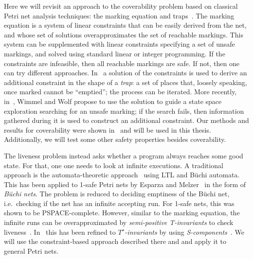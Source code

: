 Here we will revisit an approach to the coverability problem based
on classical Petri net analysis techniques: the marking equation and
traps~\cite{Murata89,Reisig13}.
The marking equation is a system of linear constraints that can be
easily derived from the net, and whose set of solutions
overapproximates the set of reachable markings. This system
can be supplemented with linear constraints specifying a set of unsafe
markings, and solved using standard linear or integer programming. If
the constraints are infeasible, then all reachable markings are safe. If
not, then one can try different approaches. In~\cite{EsparzaMelzer00}
a solution of the constraints is used to derive an additional constraint 
in the shape of a \emph{trap}: a set of places that, loosely speaking, once 
marked cannot be ``emptied''; the process can be iterated.
More recently,
in~\cite{WimmelWolf12}, Wimmel and Wolf propose to use the solution to guide a
state space exploration searching for an unsafe marking; if the search fails, 
then information gathered during it is used to construct an additional
constraint.
Our methods and results for coverability were shown
in~\cite{EsparzaLMMN14} and will be used in this thesis.
Additionally, we will test some other safety properties besides coverability.

The liveness problem instead asks whether a program always reaches some good state.
For that, one one needs to look at infinite executions.
A traditional approach is the automata-theoretic approach~\cite{VardiWolper86}
using LTL and Büchi automata.
This has been applied to 1-safe Petri nets by Esparza and Melzer~\cite{EsparzaMelzer97}
in the form of \emph{Büchi nets}.
The problem is reduced to deciding emptiness of the Büchi net, i.e.\ checking if the net
has an infinite accepting run. For 1-safe nets, this was shown to be PSPACE-complete.
However, similar to the marking equation, the infinite runs can be
overapproximated by \emph{semi-positive T-invariants} to check liveness~\cite{EsparzaBruns96}.
In~\cite{EsparzaMelzer97} this has been refined to \emph{$T^\star$-invariants} by using
\emph{S-components}~\cite{DeselEsparza95}.
We will use the constraint-based approach described there and
and apply it to general Petri nets.



